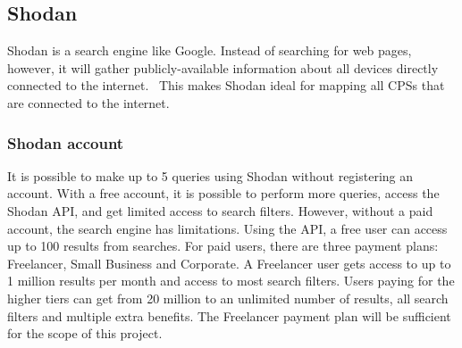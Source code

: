 \subsection{Shodan}\label{sec:shodan}
Shodan is a search engine like Google. Instead of searching for web pages, however, it will gather publicly-available information about all devices directly connected to the internet.~\cite{shodan} This makes Shodan ideal for mapping all CPSs that are connected to the internet.

\subsubsection{Shodan account}
It is possible to make up to 5 queries using Shodan without registering an account. 
With a free account, it is possible to perform more queries, access the Shodan API, and get limited access to search filters. However, without a paid account, the search engine has limitations.
Using the API, a free user can access up to 100 results from searches. 
For paid users, there are three payment plans: Freelancer, Small Business and Corporate. A Freelancer user gets access to up to 1 million results per month and access to most search filters. 
Users paying for the higher tiers can get from 20 million to an unlimited number of results, all search filters and multiple extra benefits. 
The Freelancer payment plan will be sufficient for the scope of this project.

